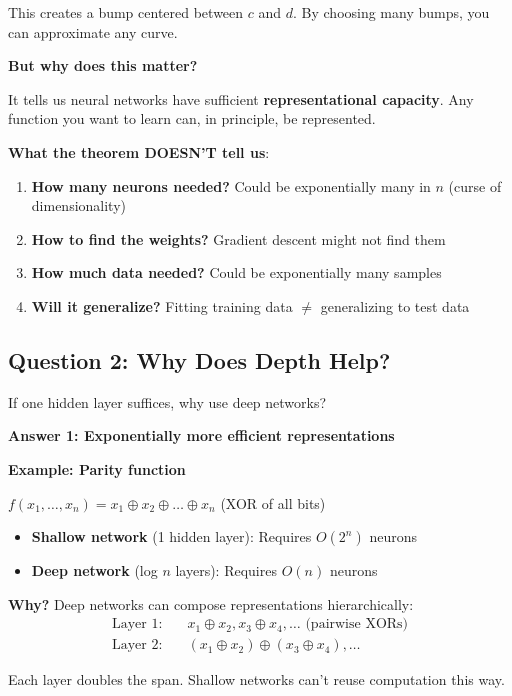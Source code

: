 This creates a bump centered between $c$ and $d$. By choosing many bumps, you can approximate any curve.

\textbf{But why does this matter?}

It tells us neural networks have sufficient \textbf{representational capacity}. Any function you want to learn can, in principle, be represented.

\textbf{What the theorem DOESN'T tell us}:

\begin{enumerate}
\item \textbf{How many neurons needed?} Could be exponentially many in $n$ (curse of dimensionality)
\item \textbf{How to find the weights?} Gradient descent might not find them
\item \textbf{How much data needed?} Could be exponentially many samples
\item \textbf{Will it generalize?} Fitting training data $\neq$ generalizing to test data
\end{enumerate}

\subsection{Question 2: Why Does Depth Help?}

If one hidden layer suffices, why use deep networks?

\textbf{Answer 1: Exponentially more efficient representations}

\textbf{Example: Parity function}

$f(x_1, \ldots, x_n) = x_1 \oplus x_2 \oplus \ldots \oplus x_n$ (XOR of all bits)

\begin{itemize}
\item \textbf{Shallow network} (1 hidden layer): Requires $O(2^n)$ neurons
\item \textbf{Deep network} (log $n$ layers): Requires $O(n)$ neurons
\end{itemize}

\textbf{Why?} Deep networks can compose representations hierarchically:
\begin{align*}
\text{Layer 1:} \quad & x_1 \oplus x_2, x_3 \oplus x_4, \ldots  \text{ (pairwise XORs)} \\
\text{Layer 2:} \quad & (x_1 \oplus x_2) \oplus (x_3 \oplus x_4), \ldots
\end{align*}

Each layer doubles the span. Shallow networks can't reuse computation this way.

